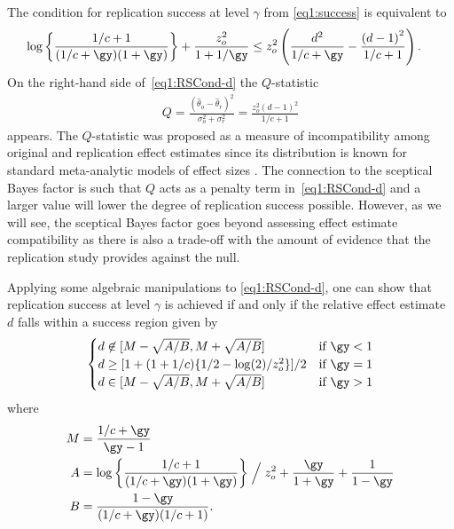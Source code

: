 The condition for replication success at level $\gamma$ from \eqref{eq1:success}
is equivalent to
\begin{align}
  \label{eq1:RSCond-d}
  \log \left\{ \frac{1/c + 1}{(1/c + \gy)(1 + \gy)}\right\} +
  \frac{z_o^2}{1 + 1/\gy} &\leq z_o^2 \left(\frac{d^2}{1/c +
    \gy} - \frac{\left(d - 1\right)^2}{1/c + 1} \right).
\end{align}
On the right-hand side of~\eqref{eq1:RSCond-d} the $Q$-statistic
\begin{align}
  \label{eq1:Qstat}
  Q
  = \frac{(\hat{\theta}_o - \hat{\theta}_r)^2}{\sigma^2_o + \sigma^2_r}
  = \frac{z_o^2(d - 1)^2}{1/c + 1}
\end{align}
appears. The $Q$-statistic was proposed as a measure of incompatibility among
original and replication effect estimates since its distribution is known for
standard meta-analytic models of effect sizes \citep{Hedges2019}. The connection
to the sceptical Bayes factor is such that $Q$ acts as a penalty term
in~\eqref{eq1:RSCond-d} and a larger value will lower the degree of replication
success possible. However, as we will see, the sceptical Bayes factor goes
beyond assessing effect estimate compatibility as there is also a trade-off with
the amount of evidence that the replication study provides against the null.

Applying some algebraic manipulations to \eqref{eq1:RSCond-d}, one can show that
replication success at level $\gamma$ is achieved if and only if the relative
effect estimate $d$ falls within a success region given by
\begin{align}
  \label{eq1:dsuccess}
  \begin{cases}
    d \not\in [M - \sqrt{A/B}, M + \sqrt{A/B}] & \text{if} ~ \gy < 1 \\
    d \geq [1 + (1 + 1/c)\{1/2 - \log(2)/z_o^2\}]/2
    & \text{if} ~ \gy = 1 \\
   d \in [M - \sqrt{A/B}, M + \sqrt{A/B}] & \text{if} ~ \gy > 1\\
  \end{cases}
\end{align}
where
\begin{align*}
  M &= \frac{1/c + \gy}{\gy - 1} \\
  A &= \log \left\{ \frac{1/c + 1}{(1/c + \gy)(1 + \gy)}\right\}\Bigm/ z_o^2 +
  \frac{\gy}{1 + \gy} + \frac{1}{1 - \gy} \\
  B &= \frac{1 - \gy}{(1/c + \gy)(1/c + 1)}.
\end{align*}


